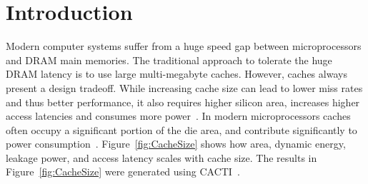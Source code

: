 
\chapter{Introduction}
\label{ch:Introduction}

Modern computer systems suffer from a huge speed gap between microprocessors and DRAM main memories. The traditional approach to tolerate the huge DRAM latency is to use large multi-megabyte caches. However, caches always present a design tradeoff. While increasing cache size can lead to lower miss rates and thus better performance, it also requires higher silicon area, increases higher access latencies and consumes more power~\cite{skadron1999branch}. In modern microprocessors caches often occupy a significant portion of the die area, and contribute significantly to power consumption~\cite{skylake,power9}. Figure~\ref{fig:CacheSize} shows how area, dynamic energy, leakage power, and access latency scales with cache size. The results in Figure~\ref{fig:CacheSize} were generated using CACTI~\cite{cacti}.\par
